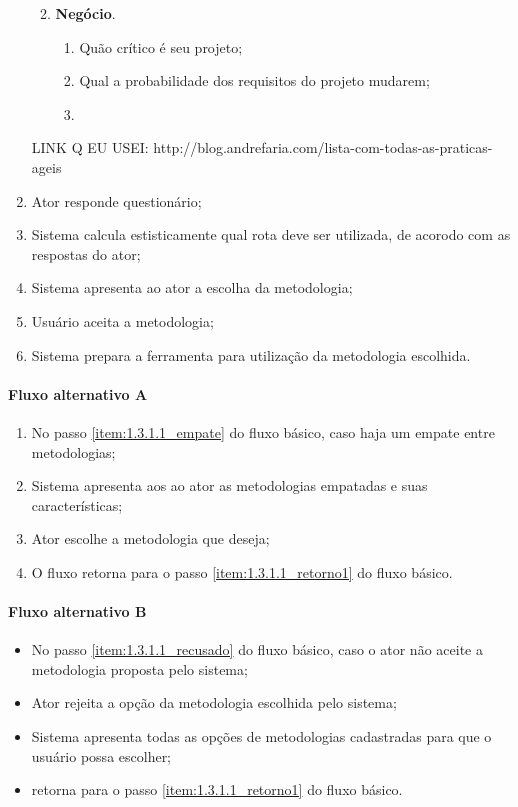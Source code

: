 \begin{enumerate}
\begin{enumerate}
\begin{enumerate}
					\end{enumerate}
				\item \textbf{Negócio}.
					\begin{enumerate}
						\item Quão crítico é seu projeto;
						\item Qual a probabilidade dos requisitos do projeto mudarem;
						\item 
					\end{enumerate}
			\end{enumerate}
			LINK Q EU USEI: http://blog.andrefaria.com/lista-com-todas-as-praticas-ageis
		\item Ator responde questionário;
		\item Sistema calcula estisticamente qual rota deve ser utilizada, de acorodo com as respostas do ator;
			\label{item:1.3.1.1_empate}
		\item Sistema apresenta ao ator a escolha da metodologia;
		\item Usuário aceita a metodologia;
			\label{item:1.3.1.1_recusado}
		\item Sistema prepara a ferramenta para utilização da metodologia escolhida.
			\label{item:1.3.1.1_retorno1}
	\end{enumerate}

\paragraph{Fluxo alternativo A}

	\begin{enumerate}
		\item No passo \ref{item:1.3.1.1_empate} do fluxo básico, caso haja um empate entre metodologias;
		\item Sistema apresenta aos ao ator as metodologias empatadas e suas características;
		\item Ator escolhe a metodologia que deseja;
		\item O fluxo retorna para o passo \ref{item:1.3.1.1_retorno1} do fluxo básico.
	\end{enumerate}

\paragraph{Fluxo alternativo B}

	\begin{itemize}
		\item No passo \ref{item:1.3.1.1_recusado} do fluxo básico, caso o ator não aceite a metodologia proposta pelo sistema;
		\item Ator rejeita a opção da metodologia escolhida pelo sistema;
		\item Sistema apresenta todas as opções de metodologias cadastradas para que o usuário possa escolher;
		\item retorna para o passo \ref{item:1.3.1.1_retorno1} do fluxo básico.
	\end{itemize}	
	
